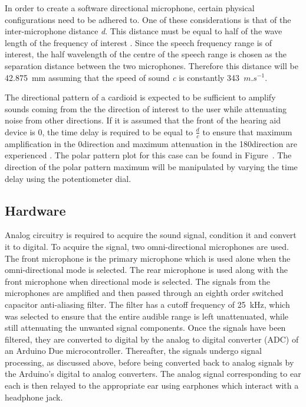 \documentclass[10pt,twocolumn]{witseiepaper}
\begin{document}
In order to create a software directional microphone, certain physical configurations need to be adhered to. One of these considerations is that of the inter-microphone distance \textit{d}. This distance must be equal to half of the wave length of the frequency of interest \cite{Distortion_of_interaural_time_cues}. Since the speech frequency range is of interest, the half wavelength of the centre of the speech range is chosen as the separation distance between the two microphones. Therefore this distance will be 42.875~mm assuming that the speed of sound \textit{c} is constantly 343~$m.s^{-1}$.

The directional pattern of a cardioid is expected to be sufficient to amplify sounds coming from the the direction of interest to the user while attenuating noise from other directions. If it is assumed that the front of the hearing aid device is 0\textdegree, the time delay is required to be equal to $\frac{d}{c}$ to ensure that maximum amplification in the 0\textdegree direction and maximum attenuation in the 180\textdegree direction are experienced \cite{Distortion_of_interaural_time_cues}. The polar pattern plot for this case can be found in Figure~. The direction of the polar pattern maximum will be manipulated by varying the time delay using the potentiometer dial. 

\subsection{Hardware} \label{sec:hardware}
Analog circuitry is required to acquire the sound signal, condition it and convert it to digital. To acquire the signal, two omni-directional microphones are used. The front microphone is the primary microphone which is used alone when the omni-directional mode is selected. The rear microphone is used along with the front microphone when directional mode is selected. The signals from the microphones are amplified and then passed through an eighth order switched capacitor anti-aliasing filter. The filter has a cutoff frequency of 25~kHz, which was selected to ensure that the entire audible range is left unattenuated, while still attenuating the unwanted signal components. Once the signals have been filtered, they are converted to digital by the analog to digital converter (ADC) of an Arduino Due microcontroller. Thereafter, the signals undergo signal processing, as discussed above, before being converted back to analog signals by the Arduino's digital to analog converters. The analog signal corresponding to ear each is then relayed to the appropriate ear using earphones which interact with a headphone jack.
\end{document}
